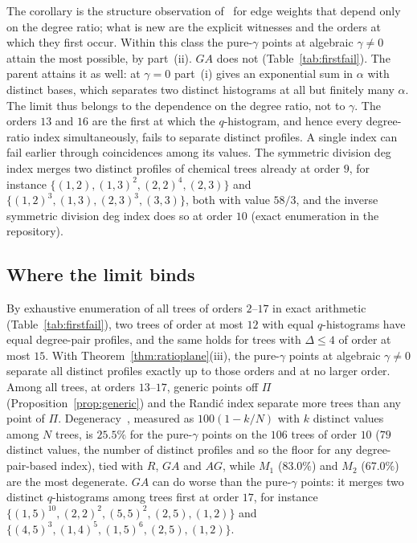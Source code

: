   The corollary is the structure observation of~\cite[Proposition~2.5]{Rada2019ExpVDB}
  for edge weights that depend only on the degree ratio; what is new are
  the explicit witnesses and the orders at which they first occur.
  Within this class the pure-$\gamma$ points at algebraic $\gamma \neq 0$
  attain the most possible, by part~(ii). $GA$ does not
  (Table~\ref{tab:firstfail}). The parent attains it as well: at
  $\gamma = 0$ part~(i) gives an exponential sum in $\alpha$ with distinct
  bases, which separates two distinct histograms at all but finitely many
  $\alpha$. The limit thus belongs to the dependence on the degree ratio,
  not to $\gamma$. The orders $13$ and $16$ are the first at which the $q$-histogram, and
  hence every degree-ratio index simultaneously, fails to separate
  distinct profiles. A single index can fail earlier through coincidences
  among its values. The symmetric division deg index merges two distinct
  profiles of chemical trees already at order $9$, for instance
  $\{(1,2), (1,3)^{2}, (2,2)^{4}, (2,3)\}$ and
  $\{(1,2)^{3}, (1,3), (2,3)^{3}, (3,3)\}$, both with value $58/3$, and the
  inverse symmetric division deg index does so at order $10$ (exact
  enumeration in the repository).

\subsection{Where the limit binds}\label{sec:degeneracy}

By exhaustive enumeration of all trees of orders $2$--$17$ in exact
arithmetic (Table~\ref{tab:firstfail}), two trees of order at most $12$
with equal $q$-histograms have equal degree-pair profiles, and the same
holds for trees with $\Delta \le 4$ of order at most $15$. With
Theorem~\ref{thm:ratioplane}(iii), the pure-$\gamma$ points at algebraic
$\gamma \neq 0$ separate all distinct profiles exactly up to those
orders and at no larger order. Among all trees, at orders $13$--$17$,
generic points off $\Pi$ (Proposition~\ref{prop:generic}) and the Randi\'c
index separate more trees than any point of $\Pi$. Degeneracy~\cite{Konstantinova1996Degeneracy},
measured as $100(1 - k/N)$ with $k$ distinct values among $N$ trees, is
$25.5\%$ for the pure-$\gamma$ points on the $106$ trees of order $10$
($79$ distinct values, the number of distinct profiles and so the floor for
any degree-pair-based index), tied with $R$, $GA$
and $AG$, while $M_1$ ($83.0\%$) and $M_2$ ($67.0\%$) are the most
degenerate. $GA$ can do worse than the pure-$\gamma$ points: it merges two
distinct $q$-histograms among trees first at order $17$, for instance
$\{(1,5)^{10}, (2,2)^{2}, (5,5)^{2}, (2,5), (1,2)\}$ and
$\{(4,5)^{3}, (1,4)^{5}, (1,5)^{6}, (2,5), (1,2)\}$.

